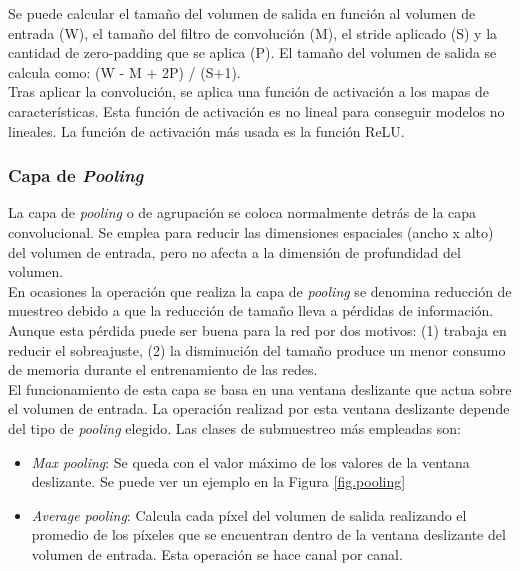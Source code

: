 Se puede calcular el tamaño del volumen de salida en función al volumen de entrada (W), el tamaño del filtro de convolución (M), el stride aplicado (S) y la cantidad de zero-padding que se aplica (P). El tamaño del volumen de salida se calcula como: (W - M + 2P) / (S+1).\\


Tras aplicar la convolución, se aplica una función de activación a los mapas de características. Esta función de activación es no lineal para conseguir modelos no lineales. La función de activación más usada es la función ReLU.


\subsubsection{Capa de \textit{Pooling}}

La capa de \textit{pooling} o de agrupación se coloca normalmente detrás de la capa convolucional. Se emplea para reducir las dimensiones espaciales (ancho x alto) del volumen de entrada, pero no afecta a la dimensión de profundidad del volumen.\\

En ocasiones la operación que realiza la capa de \textit{pooling} se denomina reducción de muestreo debido a que la reducción de tamaño lleva a pérdidas de información. Aunque esta pérdida puede ser buena para la red por dos motivos: (1) trabaja en reducir el sobreajuste, (2) la disminución del tamaño produce un menor consumo de memoria durante el entrenamiento de las redes.\\

El funcionamiento de esta capa se basa en una ventana deslizante que actua sobre el volumen de entrada. La operación realizad por esta ventana deslizante depende del tipo de \textit{pooling} elegido. Las clases de submuestreo más empleadas son:

\begin{itemize}
    \item \textit{Max pooling}: Se queda con el valor máximo de los valores de la ventana deslizante. Se puede ver un ejemplo en la Figura \ref{fig.pooling}
    
    \item \textit{Average pooling}: Calcula cada píxel del volumen de salida realizando el promedio de los píxeles que se encuentran dentro de la ventana deslizante del volumen de entrada. Esta operación se hace canal por canal.
\end{itemize}

